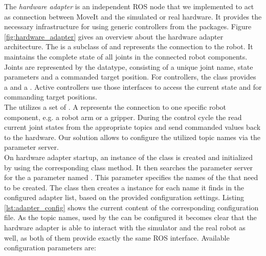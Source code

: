 The \emph{hardware adapter} is an independent ROS node that we implemented to act as connection between MoveIt and the simulated or real hardware. It provides the necessary infrastructure for using generic controllers from the  packages. Figure \ref{fig:hardware_adapter} gives an overview about the hardware adapter architecture. The  is a subclass of  and represents the connection to the robot. It maintains the complete state of all joints in the connected robot components. Joints are represented by the  datatype, consisting of a unique joint name, state parameters and a commanded target position. For controllers, the  class provides a  and a . Active controllers use those interfaces to access the current state and for commanding target positions. \\ 

The  utilizes a set of . A  represents the connection to one specific robot component, e.g. a robot arm or a gripper. During the control cycle the  read current joint states from the appropriate topics and send commanded values back to the hardware. Our solution allows to configure the utilized topic names via the parameter server.\\

On hardware adapter startup, an instance of the  class is created and initialized by using the corresponding class method. It then searches the parameter server for the a parameter named . This parameter specifies the names of the  that need to be created. The  class then creates a  instance for each name it finds in the configured adapter list, based on the provided configuration settings. Listing \ref{lst:adapter_config} shows the current content of the corresponding configuration file. As the topic names, used by the  can be configured it becomes clear that the hardware adapter is able to interact with the simulator and the real robot as well, as both of them provide exactly the same ROS interface. Available configuration parameters are:

